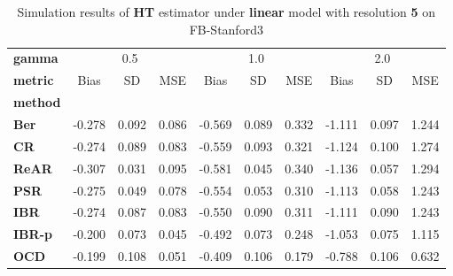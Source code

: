 \begin{table}
\centering
\caption{Simulation results of \textbf{HT} estimator under \textbf{linear} model with resolution \textbf{5} on FB-Stanford3}
\begin{tabular}{lccccccccc}
\toprule
\textbf{gamma} & \multicolumn{3}{c}{0.5} & \multicolumn{3}{c}{1.0} & \multicolumn{3}{c}{2.0} \\
\textbf{metric} &   Bias &     SD &    MSE &   Bias &     SD &    MSE &   Bias &     SD &    MSE \\
\textbf{method} &        &        &        &        &        &        &        &        &        \\
\midrule
\textbf{Ber} & -0.278 &  0.092 &  0.086 & -0.569 &  0.089 &  0.332 & -1.111 &  0.097 &  1.244 \\
\textbf{CR} & -0.274 &  0.089 &  0.083 & -0.559 &  0.093 &  0.321 & -1.124 &  0.100 &  1.274 \\
\textbf{ReAR} & -0.307 &  0.031 &  0.095 & -0.581 &  0.045 &  0.340 & -1.136 &  0.057 &  1.294 \\
\textbf{PSR} & -0.275 &  0.049 &  0.078 & -0.554 &  0.053 &  0.310 & -1.113 &  0.058 &  1.243 \\
\textbf{IBR} & -0.274 &  0.087 &  0.083 & -0.550 &  0.090 &  0.311 & -1.111 &  0.090 &  1.243 \\
\textbf{IBR-p} & -0.200 &  0.073 &  0.045 & -0.492 &  0.073 &  0.248 & -1.053 &  0.075 &  1.115 \\
\textbf{OCD} & -0.199 &  0.108 &  0.051 & -0.409 &  0.106 &  0.179 & -0.788 &  0.106 &  0.632 \\
\bottomrule
\end{tabular}
\end{table}
